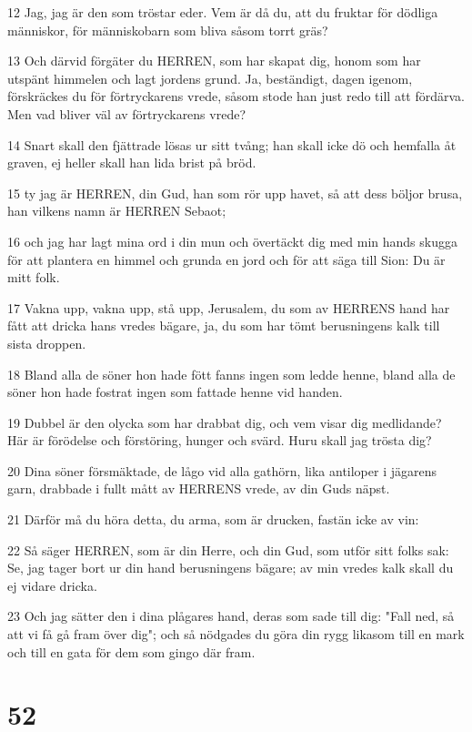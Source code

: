 \par 12 Jag, jag är den som tröstar eder. Vem är då du, att du fruktar för dödliga människor, för människobarn som bliva såsom torrt gräs?
\par 13 Och därvid förgäter du HERREN, som har skapat dig, honom som har utspänt himmelen och lagt jordens grund. Ja, beständigt, dagen igenom, förskräckes du för förtryckarens vrede, såsom stode han just redo till att fördärva. Men vad bliver väl av förtryckarens vrede?
\par 14 Snart skall den fjättrade lösas ur sitt tvång; han skall icke dö och hemfalla åt graven, ej heller skall han lida brist på bröd.
\par 15 ty jag är HERREN, din Gud, han som rör upp havet, så att dess böljor brusa, han vilkens namn är HERREN Sebaot;
\par 16 och jag har lagt mina ord i din mun och övertäckt dig med min hands skugga för att plantera en himmel och grunda en jord och för att säga till Sion: Du är mitt folk.
\par 17 Vakna upp, vakna upp, stå upp, Jerusalem, du som av HERRENS hand har fått att dricka hans vredes bägare, ja, du som har tömt berusningens kalk till sista droppen.
\par 18 Bland alla de söner hon hade fött fanns ingen som ledde henne, bland alla de söner hon hade fostrat ingen som fattade henne vid handen.
\par 19 Dubbel är den olycka som har drabbat dig, och vem visar dig medlidande? Här är förödelse och förstöring, hunger och svärd. Huru skall jag trösta dig?
\par 20 Dina söner försmäktade, de lågo vid alla gathörn, lika antiloper i jägarens garn, drabbade i fullt mått av HERRENS vrede, av din Guds näpst.
\par 21 Därför må du höra detta, du arma, som är drucken, fastän icke av vin:
\par 22 Så säger HERREN, som är din Herre, och din Gud, som utför sitt folks sak: Se, jag tager bort ur din hand berusningens bägare; av min vredes kalk skall du ej vidare dricka.
\par 23 Och jag sätter den i dina plågares hand, deras som sade till dig: "Fall ned, så att vi få gå fram över dig"; och så nödgades du göra din rygg likasom till en mark och till en gata för dem som gingo där fram.

\chapter{52}

